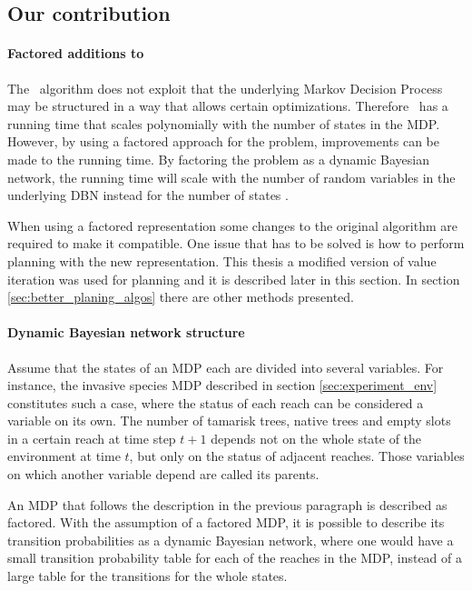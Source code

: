 \subsection{Our contribution}
\paragraph{Factored additions to \etre}
\label{sec:factored_e3}

The \etre\ algorithm does not exploit that the underlying Markov Decision
Process may be structured in a way that allows certain optimizations. Therefore
\etre\ has a running time that scales polynomially with the number of states in
the MDP. However, by using a factored approach for the problem, improvements
can be made to the running time. By factoring the problem as a dynamic Bayesian
network, the running time will scale with the number of random variables in the
underlying DBN instead for the number of states
\parencite{kearns1999efficient}. 

When using a factored representation some changes to the original algorithm are
required to make it compatible. One issue that has to be solved is how to
perform  planning with the new representation. This thesis a modified version
of value iteration was used for planning and it is described later in this
section. In section \ref{sec:better_planing_algos} there are other methods
presented.


\paragraph{Dynamic Bayesian network structure}

Assume that the states of an MDP each are divided into several variables. For
instance, the invasive species MDP described in section
\ref{sec:experiment_env} constitutes such a case, where the status of each
reach can be considered a variable on its own. The number of tamarisk trees,
native trees and empty slots in a certain reach at time step $t+1$ depends not
on the whole state of the environment at time $t$, but only on the status of
adjacent reaches. Those variables on which another variable depend are called
its parents.  

An MDP that follows the description in the previous paragraph is described as
factored. With the assumption of a factored MDP, it is possible to describe its
transition probabilities as a dynamic Bayesian network, where one would have a
small transition probability table for each of the reaches in the MDP, instead
of a large table for the transitions for the whole states.


